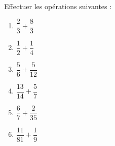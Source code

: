 
\begin{exercice}\label{exosmath-0870}

Effectuer les opérations suivantes :
\begin{multicols}{3}
    \begin{enumerate}
        \item
            \( \dfrac{ 2 }{ 3 }+\dfrac{ 8 }{ 3 }\)
        \item
            \( \dfrac{  1  }{ 2 }+\dfrac{  1  }{ 4 }\) 
        \item
            \( \dfrac{  5  }{ 6 }+\dfrac{  5  }{ 12 }\) 
        \item
            \( \dfrac{  13  }{ 14 }+\dfrac{  5  }{ 7 }\) 
        \item
            \( \dfrac{  6  }{ 7 }+\dfrac{  2  }{ 35 }\) 
        \item
            \( \dfrac{  11  }{ 81 }+\dfrac{  1  }{ 9 }\) 
    \end{enumerate}
\end{multicols}

\end{exercice}
